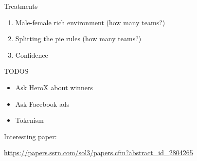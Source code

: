 \begin{frame}{Treatments}

\begin{enumerate}
\def\labelenumi{\arabic{enumi}.}
\tightlist
\item
  Male-female rich environment (how many teams?)
\item
  Splitting the pie rules (how many teams?)
\item
  Confidence
\end{enumerate}

\end{frame}

\begin{frame}{TODOS}

\begin{itemize}
\item
  Ask HeroX about winners
\item
  Ask Facebook ads
\item
  Tokenism
\end{itemize}

Interesting paper:

\url{https://papers.ssrn.com/sol3/papers.cfm?abstract_id=2804265}

\end{frame}

